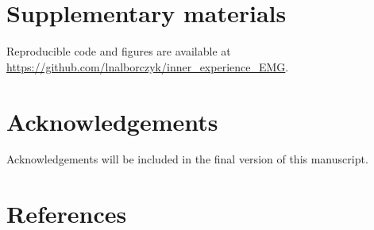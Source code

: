 \documentclass[
  english,
  man, donotrepeattitle,floatsintext]{apa6}
\begin{document}
\hypertarget{supp}{%
\section{Supplementary materials}\label{supp}}

Reproducible code and figures are available at \url{https://github.com/lnalborczyk/inner_experience_EMG}.

\hypertarget{acknowledgements}{%
\section*{Acknowledgements}\label{acknowledgements}}

Acknowledgements will be included in the final version of this manuscript.

\hypertarget{references}{%
\section*{References}\label{references}}
\end{document}
